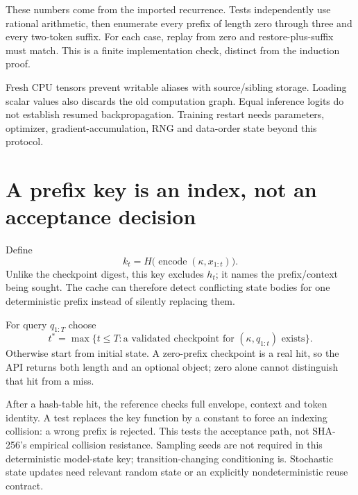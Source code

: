 
\begin{center}\end{center}

These numbers come from the imported recurrence. Tests independently use
rational arithmetic, then enumerate every prefix of length zero through
three and every two-token suffix. For each case, replay from zero and
restore-plus-suffix must match. This is a finite implementation check,
distinct from the induction proof.

Fresh CPU tensors prevent writable aliases with source/sibling storage.
Loading scalar values also discards the old computation graph. Equal inference
logits do not establish resumed backpropagation. Training restart needs
parameters, optimizer, gradient-accumulation, RNG and data-order state beyond
this protocol.

\section{A prefix key is an index, not an acceptance decision}

Define
\[
 k_t=H\bigl(\operatorname{encode}(\kappa,x_{1:t})\bigr).
\]
Unlike the checkpoint digest, this key excludes $h_t$; it names the
prefix/context being sought. The cache can therefore detect conflicting
state bodies for one deterministic prefix instead of silently replacing them.


For query $q_{1:T}$ choose
\[
 t^*=\max\{t\le T:\text{a validated checkpoint for }(\kappa,q_{1:t})\text{ exists}\}.
\]
Otherwise start from initial state. A zero-prefix checkpoint is a real hit,
so the API returns both length and an optional object; zero alone cannot
distinguish that hit from a miss.


After a hash-table hit, the reference checks full envelope, context and token
identity. A test replaces the key function by a constant to force an indexing
collision: a wrong prefix is rejected. This tests the acceptance path, not
SHA-256's empirical collision resistance.
Sampling seeds are not required in this deterministic model-state key;
transition-changing conditioning is. Stochastic state updates need relevant
random state or an explicitly nondeterministic reuse contract.

